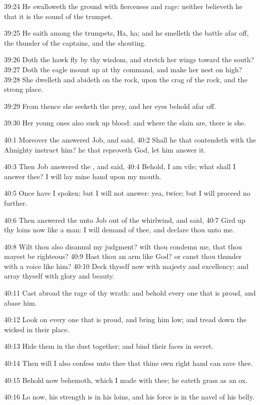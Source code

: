 39:24 He swalloweth the ground with fierceness and rage: neither
believeth he that it is the sound of the trumpet.

39:25 He saith among the trumpets, Ha, ha; and he smelleth the battle
afar off, the thunder of the captains, and the shouting.

39:26 Doth the hawk fly by thy wisdom, and stretch her wings toward
the south?  39:27 Doth the eagle mount up at thy command, and make her
nest on high?  39:28 She dwelleth and abideth on the rock, upon the
crag of the rock, and the strong place.

39:29 From thence she seeketh the prey, and her eyes behold afar off.

39:30 Her young ones also suck up blood: and where the slain are,
there is she.

40:1 Moreover the \LORD answered Job, and said, 40:2 Shall he that
contendeth with the Almighty instruct him? he that reproveth God, let
him answer it.

40:3 Then Job answered the \LORD, and said, 40:4 Behold, I am vile;
what shall I answer thee? I will lay mine hand upon my mouth.

40:5 Once have I spoken; but I will not answer: yea, twice; but I will
proceed no further.

40:6 Then answered the \LORD unto Job out of the whirlwind, and said,
40:7 Gird up thy loins now like a man: I will demand of thee, and
declare thou unto me.

40:8 Wilt thou also disannul my judgment? wilt thou condemn me, that
thou mayest be righteous?  40:9 Hast thou an arm like God? or canst
thou thunder with a voice like him?  40:10 Deck thyself now with
majesty and excellency; and array thyself with glory and beauty.

40:11 Cast abroad the rage of thy wrath: and behold every one that is
proud, and abase him.

40:12 Look on every one that is proud, and bring him low; and tread
down the wicked in their place.

40:13 Hide them in the dust together; and bind their faces in secret.

40:14 Then will I also confess unto thee that thine own right hand can
save thee.

40:15 Behold now behemoth, which I made with thee; he eateth grass as
an ox.

40:16 Lo now, his strength is in his loins, and his force is in the
navel of his belly.

